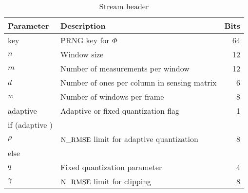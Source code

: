 \begin{table}[ht]
\centering
\caption{Stream header}
\begin{tabular}{llr}
\toprule
Parameter & Description & Bits \\
\midrule 
key & PRNG key for $\Phi$ & 64 \\
$n$ & Window size & 12 \\
$m$ & Number of measurements per window & 12 \\
$d$ & Number of ones per column in sensing matrix & 6 \\
$w$ & Number of windows per frame & 8 \\
adaptive & Adaptive or fixed quantization flag & 1 \\
if (adaptive ) &  \\
\hspace{1cm} $\rho$ & $\mathrm{N\_RMSE}$ limit for adaptive quantization & 8 \\
else & \\
\hspace{1cm} $q$ & Fixed quantization parameter & 4 \\
$\gamma$ & $\mathrm{N\_RMSE}$ limit for clipping & 8 \\
\bottomrule
\end{tabular}
\label{tbl:header:stream}
\end{table}
